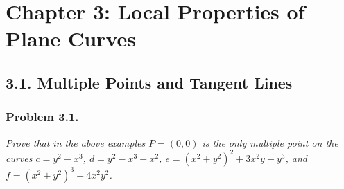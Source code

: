 \documentclass{article}
\begin{document}
\newpage
\section*{Chapter 3: Local Properties of Plane Curves \\}



\subsection*{3.1. Multiple Points and Tangent Lines \\}



\subsubsection*{Problem 3.1.}
\emph{Prove that in the above examples $P = (0,0)$
is the only multiple point on the curves
$c = y^2 - x^3$,
$d = y^2 - x^3 - x^2$,
$e = (x^2+y^2)^2 + 3x^2y - y^3$, and
$f = (x^2+y^2)^3 - 4x^2y^2$.} \\
\end{document}
